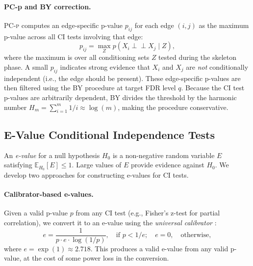 \documentclass[11pt]{article}
\newcommand{\pcp}{\textsc{PC-p}}
\newcommand{\indep}{\perp\!\!\!\perp}
\newcommand{\E}{\mathbb{E}}
\begin{document}
\paragraph{PC-p and BY correction.}
\pcp{} \citep{strobl2019estimating} computes an edge-specific p-value $p_{ij}$ for each edge $(i,j)$ as the maximum p-value across all CI tests involving that edge:
\begin{equation}
p_{ij} = \max_{Z} p(X_i \indep X_j \mid Z),
\end{equation}
where the maximum is over all conditioning sets $Z$ tested during the skeleton phase. A small $p_{ij}$ indicates strong evidence that $X_i$ and $X_j$ are \emph{not} conditionally independent (i.e., the edge should be present). These edge-specific p-values are then filtered using the BY procedure at target FDR level $q$. Because the CI test p-values are arbitrarily dependent, BY divides the threshold by the harmonic number $H_m = \sum_{i=1}^{m} 1/i \approx \log(m)$, making the procedure conservative.

\subsection{E-Value Conditional Independence Tests}

An \emph{e-value} for a null hypothesis $H_0$ is a non-negative random variable $E$ satisfying $\E_{H_0}[E] \leq 1$. Large values of $E$ provide evidence against $H_0$. We develop two approaches for constructing e-values for CI tests.

\paragraph{Calibrator-based e-values.}
Given a valid p-value $p$ from any CI test (e.g., Fisher's z-test for partial correlation), we convert it to an e-value using the \emph{universal calibrator} \citep{vovk2021evalues}:
\begin{equation}
\label{eq:calibrator}
e = \frac{1}{p \cdot e \cdot \log(1/p)}, \quad \text{if } p < 1/e; \quad e = 0, \quad \text{otherwise},
\end{equation}
where $e = \exp(1) \approx 2.718$. This produces a valid e-value from any valid p-value, at the cost of some power loss in the conversion.
\end{document}
